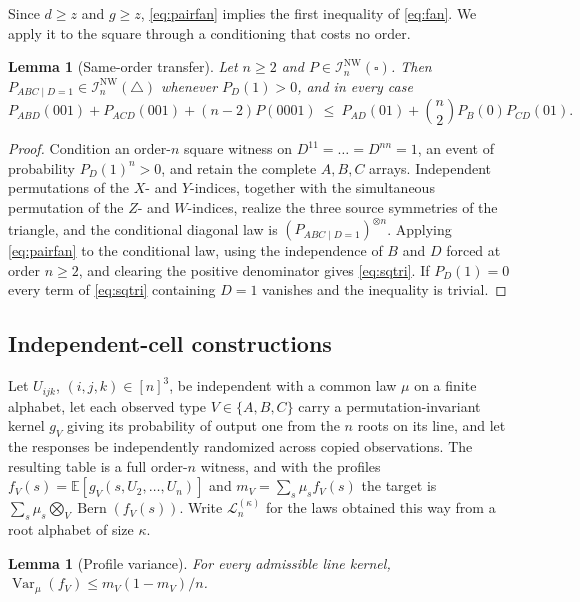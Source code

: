 \documentclass[11pt]{article}
\theoremstyle{plain}
\newtheorem{lemma}[theorem]{Lemma}
\theoremstyle{definition}
\DeclareMathOperator{\Bern}{Bern}
\newcommand{\INW}{\mathcal I^{\mathrm{NW}}}
\newcommand{\E}{\mathbb E}
\begin{document}
Since $d\ge z$ and $g\ge z$, \eqref{eq:pairfan} implies the first inequality of \eqref{eq:fan}. We apply it to the square through a conditioning that costs no order.

\begin{lemma}[Same-order transfer]\label{lem:sqtri}
Let $n\ge2$ and $P\in\INW_n(\square)$. Then $P_{ABC\mid D=1}\in\INW_n(\triangle)$ whenever $P_D(1)>0$, and in every case
\begin{equation}\label{eq:sqtri}
P_{ABD}(001)+P_{ACD}(001)+(n-2)P(0001)\ \le\ P_{AD}(01)+\binom n2P_B(0)P_{CD}(01).
\end{equation}
\end{lemma}

\begin{proof}
Condition an order-$n$ square witness on $D^{11}=\dots=D^{nn}=1$, an event of probability $P_D(1)^n>0$, and retain the complete $A,B,C$ arrays. Independent permutations of the $X$- and $Y$-indices, together with the simultaneous permutation of the $Z$- and $W$-indices, realize the three source symmetries of the triangle, and the conditional diagonal law is $(P_{ABC\mid D=1})^{\otimes n}$. Applying \eqref{eq:pairfan} to the conditional law, using the independence of $B$ and $D$ forced at order $n\ge2$, and clearing the positive denominator gives \eqref{eq:sqtri}. If $P_D(1)=0$ every term of \eqref{eq:sqtri} containing $D=1$ vanishes and the inequality is trivial.
\end{proof}


\subsection{Independent-cell constructions}

Let $U_{ijk}$, $(i,j,k)\in[n]^3$, be independent with a common law $\mu$ on a finite alphabet, let each observed type $V\in\{A,B,C\}$ carry a permutation-invariant kernel $g_V$ giving its probability of output one from the $n$ roots on its line, and let the responses be independently randomized across copied observations. The resulting table is a full order-$n$ witness, and with the profiles $f_V(s)=\E[g_V(s,U_2,\dots,U_n)]$ and $m_V=\sum_s\mu_sf_V(s)$ the target is $\sum_s\mu_s\bigotimes_V\Bern(f_V(s))$. Write $\mathcal L_n^{(\kappa)}$ for the laws obtained this way from a root alphabet of size $\kappa$.

\begin{lemma}[Profile variance]\label{lem:cellvar}
For every admissible line kernel, $\operatorname{Var}_\mu(f_V)\le m_V(1-m_V)/n$.
\end{lemma}
\end{document}
